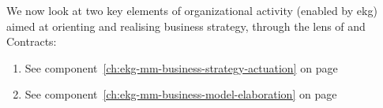 We now look at two key elements of organizational activity (enabled by \gls{ekg}) aimed at orienting and
realising business strategy, through the lens of 
and Contracts:

\begin{enumerate}
    \item 

    See component~\ref{ch:ekg-mm-business-strategy-actuation} 
    on page \pageref{ch:ekg-mm-business-strategy-actuation}

    \item 

    See component~\ref{ch:ekg-mm-business-model-elaboration} 
    on page \pageref{ch:ekg-mm-business-model-elaboration}
\end{enumerate}
